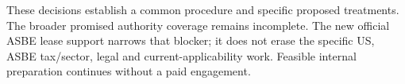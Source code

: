 These decisions establish a common procedure and specific proposed treatments. The broader promised authority coverage remains incomplete. The new official ASBE lease support narrows that blocker; it does not erase the specific US, ASBE tax/sector, legal and current-applicability work. Feasible internal preparation continues without a paid engagement.
